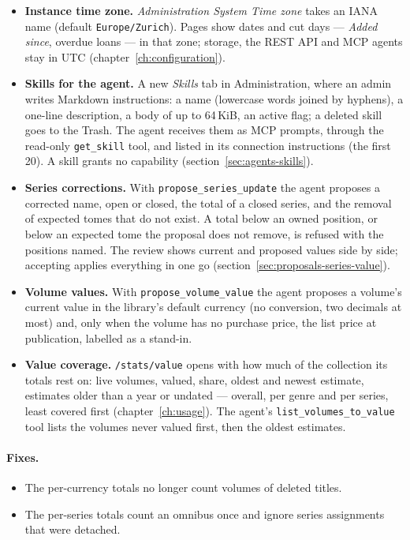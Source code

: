 \begin{itemize}
  \item \textbf{Instance time zone.} \emph{Administration
        \textrightarrow{} System \textrightarrow{} Time zone} takes an
        IANA name (default \texttt{Europe/Zurich}). Pages show dates and
        cut days --- \emph{Added since}, overdue loans --- in that zone;
        storage, the REST API and MCP agents stay in UTC
        (chapter~\ref{ch:configuration}).
  \item \textbf{Skills for the agent.} A new \emph{Skills} tab in
        Administration, where an admin writes Markdown instructions: a
        name (lowercase words joined by hyphens), a one-line
        description, a body of up to 64\,KiB, an active flag; a deleted
        skill goes to the Trash. The agent receives them as MCP prompts,
        through the read-only \texttt{get\_skill} tool, and listed in its
        connection instructions (the first 20). A skill grants no
        capability (section~\ref{sec:agents-skills}).
  \item \textbf{Series corrections.} With
        \texttt{propose\_series\_update} the agent proposes a corrected
        name, open or closed, the total of a closed series, and the
        removal of expected tomes that do not exist. A total below an
        owned position, or below an expected tome the proposal does not
        remove, is refused with the positions named. The review shows
        current and proposed values side by side; accepting applies
        everything in one go (section~\ref{sec:proposals-series-value}).
  \item \textbf{Volume values.} With \texttt{propose\_volume\_value}
        the agent proposes a volume's current value in the library's
        default currency (no conversion, two decimals at most) and,
        only when the volume has no purchase price, the list price at
        publication, labelled as a stand-in.
  \item \textbf{Value coverage.} \texttt{/stats/value} opens with how
        much of the collection its totals rest on: live volumes, valued,
        share, oldest and newest estimate, estimates older than a year
        or undated --- overall, per genre and per series, least covered
        first (chapter~\ref{ch:usage}). The agent's
        \texttt{list\_volumes\_to\_value} tool lists the volumes never
        valued first, then the oldest estimates.
\end{itemize}

\paragraph{Fixes.}
\begin{itemize}
  \item The per-currency totals no longer count volumes of deleted
        titles.
  \item The per-series totals count an omnibus once and ignore series
        assignments that were detached.
\end{itemize}

